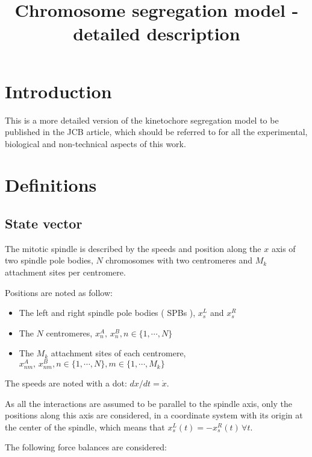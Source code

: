 \documentclass[a4paper,12pt]{article}
\title{Chromosome segregation model - detailed description}
\begin{document}


\maketitle{}


\section*{Introduction}

This is a more detailed version of the kinetochore segregation model
to be published in the JCB article, which should be referred to for
all the experimental, biological and non-technical aspects of this
work.

 
\section{Definitions}
\label{sec:defs}

\subsection{State vector}

The mitotic spindle is described by the speeds and position along the
$x$ axis of two spindle pole bodies, $N$ chromosomes with two
centromeres and $M_k$ attachment sites per centromere.

Positions are noted as follow:
\begin{itemize}
\item The left and right spindle pole bodies ( SPBs ), $x_s^L$ and $x_s^R$
\item The $N$ centromeres, $x_n^A, \, x_n^B, n \in \{1,\cdots, N\}$
\item The $M_k$ attachment sites of each centromere, $x_{nm}^A, \,
  x_{nm}^B, n \in \{1, \cdots, N \}, m \in \{1, \cdots, M_k\}$
\end{itemize}
The speeds are noted with a dot: $dx / dt = \dot{x}$.

As all the interactions are assumed to be parallel to the spindle
axis, only the positions along this axis are considered, in a coordinate
system with its origin at the center of the spindle, which means that
$x_s^L(t) = - x_s^R(t)\, \forall t$.

The following force balances are considered:
\end{document}
